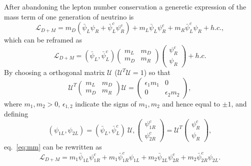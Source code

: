 After abandoning the lepton number conservation a generetic expression
of the mass term of one generation of neutrino is
\begin{equation}
  \label{eq:dmm}
  \mathcal{L}_{D+M} = m_{D}(\bar{\psi}_{L}\psi_{R} +  
\bar{\psi}^{c}_{L}\psi^{c}_{R}) +
  m_{L}\bar{\psi}_{L}\psi^{c}_{R} +   m_{R}\bar{\psi}^{c}_{L}\psi_{R}
+ h.c.,
\end{equation}
which can be reframed as
\begin{equation}
  \label{eq:mm}
  \mathcal{L}_{D+M} = (\bar{\psi}_{L},\bar{\psi}^{c}_{L})
  \left(\begin{array}{cc}m_L & m_D \\ m_D & m_R\end{array}\right)
  \left(\begin{array}{c}\psi^{c}_R \\ \psi_R\end{array}\right) + h.c.
\end{equation}
By choosing a orthogonal matrix $\mathcal{U}$ ($\mathcal{U}^{T}
\mathcal{U} = 1$) so that
\begin{equation}
  \label{eq:mmat}
  \mathcal{U}^{T}\left(\begin{array}{cc}m_L & m_D \\ m_D &       
m_R\end{array}\right)\mathcal{U} = 
  \left(\begin{array}{cc}\epsilon_{1}m_1 & 0 \\ 0 &            
\epsilon_{2}m_2\end{array}\right),
\end{equation}
where $m_{1}, m_{2} > 0$, $\epsilon_{1,2}$ indicate the signs of
$m_{1}, m_{2}$ and hence equal to $\pm 1$, and defining
\begin{equation}
  \label{eq:mvet}
  (\psi_{1L}, \psi_{2L}) = 
  (\bar{\psi}_{L}, \bar{\psi}^{c}_{L})~ \mathcal{U},
  \left(\begin{array}{c} \psi^{c}_{1R} \\            
\psi^{c}_{2R}\end{array}\right) = \mathcal{U}^{T}
  \left(\begin{array}{c} \psi^{c}_{R} \\ \psi_{R} \end{array}\right),
\end{equation}
eq.~\ref{eq:mm} can be rewritten as
\begin{equation}
  \label{eq:m12}
  \mathcal{L}_{D+M} = m_{1}\bar{\psi}_{1L}\psi^{c}_{1R} +  
m_{1}\bar{\psi}^{c}_{1R}\psi_{1L} +
  m_{2}\bar{\psi}_{2L}\psi^{c}_{2R} +  
m_{2}\bar{\psi}^{c}_{2R}\psi_{2L}.
\end{equation}
